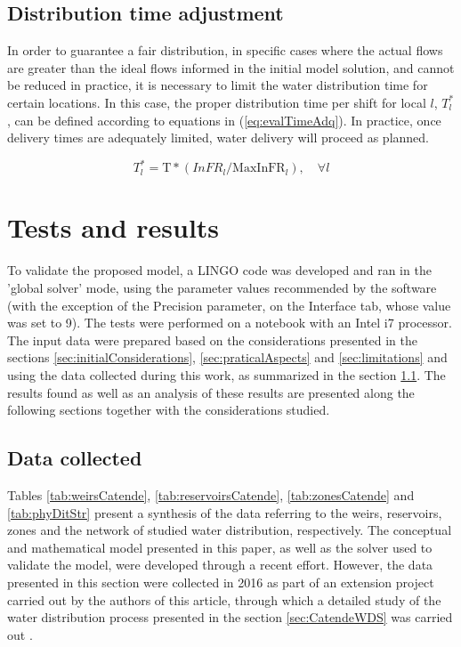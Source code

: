 \documentclass{singlecol}
\theoremstyle{TH}{
\newtheorem{lemma}{Lemma}
\newtheorem{theorem}[lemma]{Theorem}
\newtheorem{corrolary}[lemma]{Corrolary}
\newtheorem{conjecture}[lemma]{Conjecture}
\newtheorem{proposition}[lemma]{Proposition}
\newtheorem{claim}[lemma]{Claim}
\newtheorem{stheorem}[lemma]{Wrong Theorem}
\newtheorem{algorithm}{Algorithm}
}
\theoremstyle{THrm}{
\newtheorem{definition}{Definition}[section]
\newtheorem{question}{Question}[section]
\newtheorem{remark}{Remark}
\newtheorem{scheme}{Scheme}
}
\theoremstyle{THhit}{
\newtheorem{case}{Case}[section]
}
\begin{document}
\subsection{Distribution time adjustment}

In order to guarantee a fair distribution, in specific cases where the actual flows are greater than the ideal flows informed in the initial model solution, and cannot be reduced in practice, it is necessary to limit the water distribution time for certain locations. In this case, the proper distribution time per shift for local $l$, $T^*_{l}$, can be defined according to equations in (\ref{eq:evalTimeAdq}). In practice, once delivery times are adequately limited, water delivery will proceed as planned.


\begin{equation}
	T^*_{l} = \mathrm{T} * ({InFR}_l / \mathrm{MaxInFR}_{l}), \quad \forall l
	\label{eq:evalTimeAdq}
\end{equation}


\section{Tests and results}

To validate the proposed model, a LINGO code was developed and ran in the 'global solver' mode, using the parameter values recommended by the software \cite{LINGO} (with the exception of the Precision parameter, on the Interface tab, whose value was set to 9). The tests were performed on a notebook with an Intel i7 processor. The input data were prepared based on the considerations presented in the sections \ref{sec:initialConsiderations}, \ref{sec:praticalAspects} and \ref{sec:limitations} and using the data collected during this work, as summarized in the section \ref{sec:data}. The results found as well as an analysis of these results are presented along the following sections together with the considerations studied. 

\subsection{Data collected}
\label{sec:data}

Tables \ref{tab:weirsCatende}, \ref{tab:reservoirsCatende}, \ref{tab:zonesCatende} and \ref{tab:phyDitStr} present a synthesis of the data referring to the weirs, reservoirs, zones and the network of studied water distribution, respectively. The conceptual and mathematical model presented in this paper, as well as the solver used to validate the model, were developed through a recent effort. However, the data presented in this section were collected in 2016 as part of an extension project carried out by the authors of this article, through which a detailed study of the water distribution process presented in the section \ref{sec:CatendeWDS} was carried out \citep{CandidoEtAl2016}. 
\end{document}
